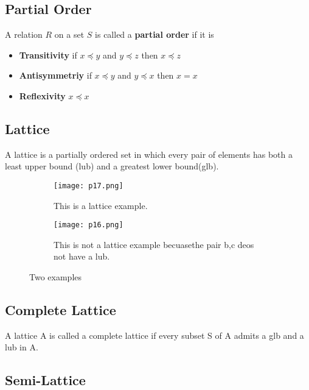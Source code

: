 \subsection{Partial Order}

A relation \(R\) on a set \(S\) is called a \textbf{partial order} if it is

\begin{itemize}
	\item \textbf{Transitivity} if \(x \preceq y\) and  \(y \preceq z\) then  \(x \preceq z\)
	\item \textbf{Antisymmetriy} if \(x \preceq y\) and  \(y \preceq x\) then  \(x = x\)
	\item \textbf{Reflexivity}  \(x \preceq x\)
\end{itemize}

\subsection{Lattice}

A lattice is a partially ordered set in which every pair of elements has both a least upper bound (lub)
and a greatest lower bound(glb).

\begin{figure}[h]
	\centering
	\begin{subfigure}[b]{0.3\textwidth}
		\centering
		\texttt{[image: p17.png]}
		\caption{This is a lattice example.}
		\label{fig:p17}
	\end{subfigure}
	\hfill
	\begin{subfigure}[b]{0.3\textwidth}
		\centering
		\texttt{[image: p16.png]}
		\caption{This is not a lattice example becuasethe pair {b,c} deos not have a lub.}
		\label{fig:three sin x}
	\end{subfigure}
	\caption{Two examples}
	\label{fig:p16}
\end{figure}





\subsection{Complete Lattice}

A lattice A is called a complete lattice if every subset S of A admits a
glb and a lub in A.



\subsection{Semi-Lattice}

